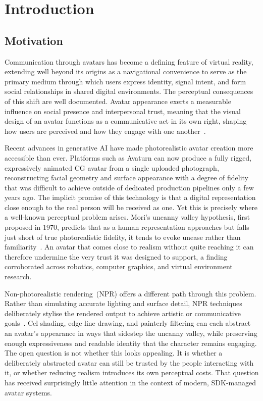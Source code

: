 \chapter{Introduction}
\label{ch:introduction}

\section{Motivation}
\label{sec:motivation}

Communication through avatars has become a defining feature of virtual reality, extending well beyond its origins as a navigational convenience to serve as the primary medium through which users express identity, signal intent, and form social relationships in shared digital environments.
The perceptual consequences of this shift are well documented.
Avatar appearance exerts a measurable influence on social presence and interpersonal trust, meaning that the visual design of an avatar functions as a communicative act in its own right, shaping how users are perceived and how they engage with one another~\cite{nowak2003, weidner2023}.

Recent advances in generative AI have made photorealistic avatar creation more accessible than ever.
Platforms such as Avaturn can now produce a fully rigged, expressively animated CG avatar from a single uploaded photograph, reconstructing facial geometry and surface appearance with a degree of fidelity that was difficult to achieve outside of dedicated production pipelines only a few years ago.
The implicit promise of this technology is that a digital representation close enough to the real person will be received as one.
Yet this is precisely where a well-known perceptual problem arises.
Mori's uncanny valley hypothesis, first proposed in 1970, predicts that as a human representation approaches but falls just short of true photorealistic fidelity, it tends to evoke unease rather than familiarity~\cite{mori1970}.
An avatar that comes close to realism without quite reaching it can therefore undermine the very trust it was designed to support, a finding corroborated across robotics, computer graphics, and virtual environment research.

Non-photorealistic rendering~(NPR) offers a different path through this problem.
Rather than simulating accurate lighting and surface detail, NPR techniques deliberately stylise the rendered output to achieve artistic or communicative goals~\cite{gooch1998}.
Cel shading, edge line drawing, and painterly filtering can each abstract an avatar's appearance in ways that sidestep the uncanny valley, while preserving enough expressiveness and readable identity that the character remains engaging.
The open question is not whether this looks appealing.
It is whether a deliberately abstracted avatar can still be trusted by the people interacting with it, or whether reducing realism introduces its own perceptual costs.
That question has received surprisingly little attention in the context of modern, SDK-managed avatar systems.

